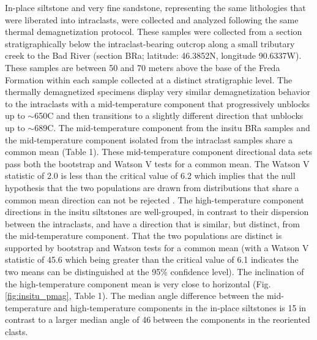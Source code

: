 \documentclass[draft]{agujournal2019}
\begin{document}
In-place siltstone and very fine sandstone, representing the same lithologies that were liberated into intraclasts, were collected and analyzed following the same thermal demagnetization protocol. These samples were collected from a section stratigraphically below the intraclast-bearing outcrop along a small tributary creek to the Bad River (section BRa; latitude: 46.3852\textdegree N, longitude 90.6337\textdegree W). These samples are between 50 and 70 meters above the base of the Freda Formation within each sample collected at a distinct stratigraphic level. The thermally demagnetized specimens display very similar demagnetization behavior to the intraclasts with a mid-temperature component that progressively unblocks up to $\sim$650\textdegree C and then transitions to a slightly different direction that unblocks up to $\sim$689\textdegree C. The mid-temperature component from the insitu BRa samples and the mid-temperature component isolated from the intraclast samples share a common mean (Table 1). These mid-temperature component directional data sets pass both the bootstrap and Watson V tests for a common mean. The Watson V statistic of 2.0 is less than the critical value of 6.2 which implies that the null hypothesis that the two populations are drawn from distributions that share a common mean direction can not be rejected \cite{Watson1983a}. The high-temperature component directions in the insitu siltstones are well-grouped, in contrast to their dispersion between the intraclasts, and have a direction that is similar, but distinct, from the mid-temperature component. That the two populations are distinct is supported by bootstrap and Watson tests for a common mean (with a Watson V statistic of 45.6 which being greater than the critical value of 6.1 indicates the two means can be distinguished at the 95\% confidence level). The inclination of the high-temperature component mean is very close to horizontal (Fig. \ref{fig:insitu_pmag}, Table 1). The median angle difference between the mid-temperature and high-temperature components in the in-place siltstones is 15\textdegree$\;$in contrast to a larger median angle of 46\textdegree$\;$between the components in the reoriented clasts.
\end{document}
